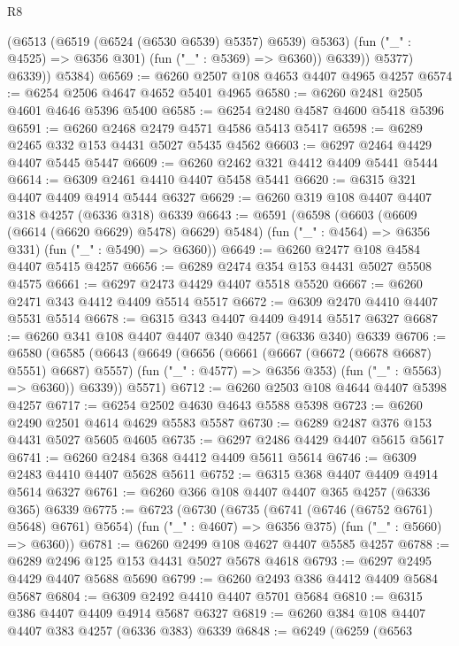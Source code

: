 \begin{lexlean}{R8}
\begin{coremodule}
                  (@6513 (@6519 (@6524 (@6530 @6539) @5357) @6539) @5363)
                  (fun ("_" : @4525) => @6356 @301)
                  (fun ("_" : @5369) => @6360))
                @6339))
            @5377)
          @6339))
      @5384)
@6569 := @6260 @2507 @108 @4653 @4407 @4965 @4257
@6574 := @6254 @2506 @4647 @4652 @5401 @4965
@6580 := @6260 @2481 @2505 @4601 @4646 @5396 @5400
@6585 := @6254 @2480 @4587 @4600 @5418 @5396
@6591 := @6260 @2468 @2479 @4571 @4586 @5413 @5417
@6598 := @6289 @2465 @332 @153 @4431 @5027 @5435 @4562
@6603 := @6297 @2464 @4429 @4407 @5445 @5447
@6609 := @6260 @2462 @321 @4412 @4409 @5441 @5444
@6614 := @6309 @2461 @4410 @4407 @5458 @5441
@6620 := @6315 @321 @4407 @4409 @4914 @5444 @6327
@6629 := @6260 @319 @108 @4407 @4407 @318 @4257 (@6336 @318) @6339
@6643 := @6591
    (@6598
      (@6603 (@6609 (@6614 (@6620 @6629) @5478) @6629) @5484)
      (fun ("_" : @4564) => @6356 @331)
      (fun ("_" : @5490) => @6360))
@6649 := @6260 @2477 @108 @4584 @4407 @5415 @4257
@6656 := @6289 @2474 @354 @153 @4431 @5027 @5508 @4575
@6661 := @6297 @2473 @4429 @4407 @5518 @5520
@6667 := @6260 @2471 @343 @4412 @4409 @5514 @5517
@6672 := @6309 @2470 @4410 @4407 @5531 @5514
@6678 := @6315 @343 @4407 @4409 @4914 @5517 @6327
@6687 := @6260 @341 @108 @4407 @4407 @340 @4257 (@6336 @340) @6339
@6706 := @6580
    (@6585
      (@6643
        (@6649
          (@6656
            (@6661 (@6667 (@6672 (@6678 @6687) @5551) @6687) @5557)
            (fun ("_" : @4577) => @6356 @353)
            (fun ("_" : @5563) => @6360))
          @6339))
      @5571)
@6712 := @6260 @2503 @108 @4644 @4407 @5398 @4257
@6717 := @6254 @2502 @4630 @4643 @5588 @5398
@6723 := @6260 @2490 @2501 @4614 @4629 @5583 @5587
@6730 := @6289 @2487 @376 @153 @4431 @5027 @5605 @4605
@6735 := @6297 @2486 @4429 @4407 @5615 @5617
@6741 := @6260 @2484 @368 @4412 @4409 @5611 @5614
@6746 := @6309 @2483 @4410 @4407 @5628 @5611
@6752 := @6315 @368 @4407 @4409 @4914 @5614 @6327
@6761 := @6260 @366 @108 @4407 @4407 @365 @4257 (@6336 @365) @6339
@6775 := @6723
    (@6730
      (@6735 (@6741 (@6746 (@6752 @6761) @5648) @6761) @5654)
      (fun ("_" : @4607) => @6356 @375)
      (fun ("_" : @5660) => @6360))
@6781 := @6260 @2499 @108 @4627 @4407 @5585 @4257
@6788 := @6289 @2496 @125 @153 @4431 @5027 @5678 @4618
@6793 := @6297 @2495 @4429 @4407 @5688 @5690
@6799 := @6260 @2493 @386 @4412 @4409 @5684 @5687
@6804 := @6309 @2492 @4410 @4407 @5701 @5684
@6810 := @6315 @386 @4407 @4409 @4914 @5687 @6327
@6819 := @6260 @384 @108 @4407 @4407 @383 @4257 (@6336 @383) @6339
@6848 := @6249
    (@6259
      (@6563

\end{coremodule}
\end{lexlean}
